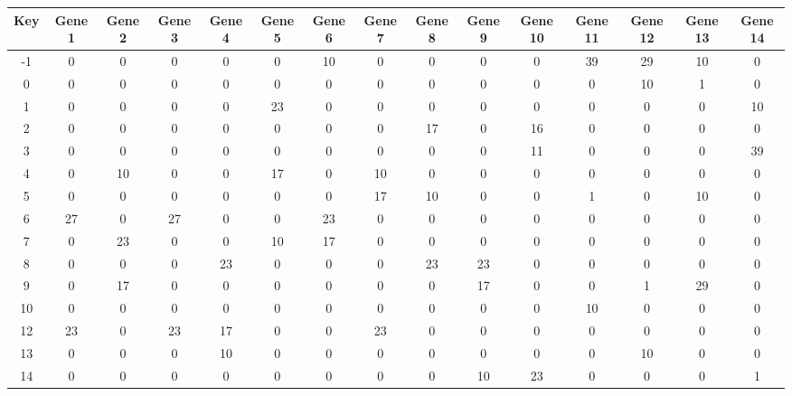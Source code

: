 \begin{tabular}{|c|c|c|c|c|c|c|c|c|c|c|c|c|c|c|}
\hline
Key & Gene 1 & Gene 2 & Gene 3 & Gene 4 & Gene 5 & Gene 6 & Gene 7 & Gene 8 & Gene 9 & Gene 10 & Gene 11 & Gene 12 & Gene 13 & Gene 14 \\
\hline
-1 & 0 & 0 & 0 & 0 & 0 & 10 & 0 & 0 & 0 & 0 & 39 & 29 & 10 & 0 \\
0 & 0 & 0 & 0 & 0 & 0 & 0 & 0 & 0 & 0 & 0 & 0 & 10 & 1 & 0 \\
1 & 0 & 0 & 0 & 0 & 23 & 0 & 0 & 0 & 0 & 0 & 0 & 0 & 0 & 10 \\
2 & 0 & 0 & 0 & 0 & 0 & 0 & 0 & 17 & 0 & 16 & 0 & 0 & 0 & 0 \\
3 & 0 & 0 & 0 & 0 & 0 & 0 & 0 & 0 & 0 & 11 & 0 & 0 & 0 & 39 \\
4 & 0 & 10 & 0 & 0 & 17 & 0 & 10 & 0 & 0 & 0 & 0 & 0 & 0 & 0 \\
5 & 0 & 0 & 0 & 0 & 0 & 0 & 17 & 10 & 0 & 0 & 1 & 0 & 10 & 0 \\
6 & 27 & 0 & 27 & 0 & 0 & 23 & 0 & 0 & 0 & 0 & 0 & 0 & 0 & 0 \\
7 & 0 & 23 & 0 & 0 & 10 & 17 & 0 & 0 & 0 & 0 & 0 & 0 & 0 & 0 \\
8 & 0 & 0 & 0 & 23 & 0 & 0 & 0 & 23 & 23 & 0 & 0 & 0 & 0 & 0 \\
9 & 0 & 17 & 0 & 0 & 0 & 0 & 0 & 0 & 17 & 0 & 0 & 1 & 29 & 0 \\
10 & 0 & 0 & 0 & 0 & 0 & 0 & 0 & 0 & 0 & 0 & 10 & 0 & 0 & 0 \\
12 & 23 & 0 & 23 & 17 & 0 & 0 & 23 & 0 & 0 & 0 & 0 & 0 & 0 & 0 \\
13 & 0 & 0 & 0 & 10 & 0 & 0 & 0 & 0 & 0 & 0 & 0 & 10 & 0 & 0 \\
14 & 0 & 0 & 0 & 0 & 0 & 0 & 0 & 0 & 10 & 23 & 0 & 0 & 0 & 1 \\
\hline
\end{tabular}